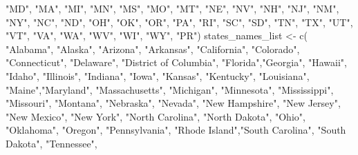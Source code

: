 \documentclass[
]{book}
\newenvironment{Shaded}{\begin{snugshade}}{\end{snugshade}}
\newcommand{\FunctionTok}[1]{\textcolor[rgb]{0.00,0.00,0.00}{#1}}
\newcommand{\NormalTok}[1]{#1}
\newcommand{\OtherTok}[1]{\textcolor[rgb]{0.56,0.35,0.01}{#1}}
\newcommand{\StringTok}[1]{\textcolor[rgb]{0.31,0.60,0.02}{#1}}
\begin{document}
\begin{Shaded}
\begin{Highlighting}[]
  \StringTok{"MD"}\NormalTok{, }\StringTok{"MA"}\NormalTok{, }\StringTok{"MI"}\NormalTok{, }\StringTok{"MN"}\NormalTok{, }\StringTok{"MS"}\NormalTok{, }\StringTok{"MO"}\NormalTok{, }\StringTok{"MT"}\NormalTok{, }\StringTok{"NE"}\NormalTok{, }\StringTok{"NV"}\NormalTok{, }\StringTok{"NH"}\NormalTok{,}
  \StringTok{"NJ"}\NormalTok{, }\StringTok{"NM"}\NormalTok{, }\StringTok{"NY"}\NormalTok{, }\StringTok{"NC"}\NormalTok{, }\StringTok{"ND"}\NormalTok{, }\StringTok{"OH"}\NormalTok{, }\StringTok{"OK"}\NormalTok{, }\StringTok{"OR"}\NormalTok{, }\StringTok{"PA"}\NormalTok{, }\StringTok{"RI"}\NormalTok{,}
  \StringTok{"SC"}\NormalTok{, }\StringTok{"SD"}\NormalTok{, }\StringTok{"TN"}\NormalTok{, }\StringTok{"TX"}\NormalTok{, }\StringTok{"UT"}\NormalTok{, }\StringTok{"VT"}\NormalTok{, }\StringTok{"VA"}\NormalTok{, }\StringTok{"WA"}\NormalTok{, }\StringTok{"WV"}\NormalTok{, }\StringTok{"WI"}\NormalTok{,}
  \StringTok{"WY"}\NormalTok{, }\StringTok{"PR"}\NormalTok{)}
\NormalTok{states\_names\_list }\OtherTok{\textless{}{-}} \FunctionTok{c}\NormalTok{(}
  \StringTok{"Alabama"}\NormalTok{, }\StringTok{"Alaska"}\NormalTok{, }\StringTok{"Arizona"}\NormalTok{, }\StringTok{"Arkansas"}\NormalTok{, }\StringTok{"California"}\NormalTok{, }
  \StringTok{"Colorado"}\NormalTok{, }\StringTok{"Connecticut"}\NormalTok{, }\StringTok{"Delaware"}\NormalTok{, }
  \StringTok{"District of Columbia"}\NormalTok{, }\StringTok{"Florida"}\NormalTok{,}\StringTok{"Georgia"}\NormalTok{, }\StringTok{"Hawaii"}\NormalTok{, }
  \StringTok{"Idaho"}\NormalTok{, }\StringTok{"Illinois"}\NormalTok{, }\StringTok{"Indiana"}\NormalTok{, }\StringTok{"Iowa"}\NormalTok{, }\StringTok{"Kansas"}\NormalTok{, }
  \StringTok{"Kentucky"}\NormalTok{, }\StringTok{"Louisiana"}\NormalTok{, }\StringTok{"Maine"}\NormalTok{,}\StringTok{"Maryland"}\NormalTok{, }
  \StringTok{"Massachusetts"}\NormalTok{, }\StringTok{"Michigan"}\NormalTok{, }\StringTok{"Minnesota"}\NormalTok{, }\StringTok{"Mississippi"}\NormalTok{, }
  \StringTok{"Missouri"}\NormalTok{, }\StringTok{"Montana"}\NormalTok{, }\StringTok{"Nebraska"}\NormalTok{, }\StringTok{"Nevada"}\NormalTok{, }\StringTok{"New Hampshire"}\NormalTok{,}
  \StringTok{"New Jersey"}\NormalTok{, }\StringTok{"New Mexico"}\NormalTok{, }\StringTok{"New York"}\NormalTok{, }\StringTok{"North Carolina"}\NormalTok{, }
  \StringTok{"North Dakota"}\NormalTok{, }\StringTok{"Ohio"}\NormalTok{, }\StringTok{"Oklahoma"}\NormalTok{, }\StringTok{"Oregon"}\NormalTok{, }\StringTok{"Pennsylvania"}\NormalTok{, }
  \StringTok{"Rhode Island"}\NormalTok{,}\StringTok{"South Carolina"}\NormalTok{, }\StringTok{"South Dakota"}\NormalTok{, }\StringTok{"Tennessee"}\NormalTok{, }

\end{Highlighting}
\end{Shaded}
\end{document}
